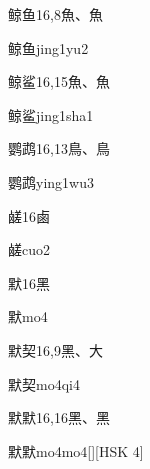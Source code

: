 \begin{entry}{鲸鱼}{16,8}{⿂、⿂}
  \begin{phonetics}{鲸鱼}{jing1yu2}
  \end{phonetics}
\end{entry}

\begin{entry}{鲸鲨}{16,15}{⿂、⿂}
  \begin{phonetics}{鲸鲨}{jing1sha1}
  \end{phonetics}
\end{entry}

\begin{entry}{鹦鹉}{16,13}{⿃、⿃}
  \begin{phonetics}{鹦鹉}{ying1wu3}
  \end{phonetics}
\end{entry}

\begin{entry}{鹾}{16}{⿄}
  \begin{phonetics}{鹾}{cuo2}
  \end{phonetics}
\end{entry}

\begin{entry}{默}{16}{⿊}
  \begin{phonetics}{默}{mo4}
  \end{phonetics}
\end{entry}

\begin{entry}{默契}{16,9}{⿊、⼤}
  \begin{phonetics}{默契}{mo4qi4}
  \end{phonetics}
\end{entry}

\begin{entry}{默默}{16,16}{⿊、⿊}
  \begin{phonetics}{默默}{mo4mo4}[][HSK 4]
  \end{phonetics}
\end{entry}


